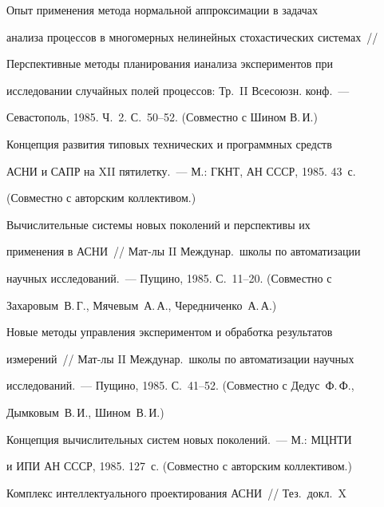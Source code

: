  Опыт применения метода нормальной аппроксимации в за\-дачах


анализа процессов в многомерных нелинейных сто\-ха\-сти\-че\-ских системах~//


Перспективные методы планирования и\linebreak анализа экспериментов при


исследовании случайных полей процессов: Тр.~II Всесоюзн. конф.~---


Севастополь, 1985. Ч.~2. С.~50--52. (Совместно с Шином В.\,И.)





 Концепция развития типовых технических и программных средств


АСНИ и САПР на XII пятилетку.~--- М.: ГКНТ, АН СССР, 1985. 43~с.


(Совместно с авторским коллективом.)





 Вычислительные системы новых поколений и перспективы их


применения в АСНИ~// Мат-лы II Междунар.\ школы по автоматизации


научных исследований.~--- Пущино, 1985. С.~11--20. (Совместно с


Захаровым~В.\,Г., Мячевым~А.\,А., Чередниченко~А.\,А.)





 Новые методы управления экспериментом и обработка результатов


измерений~// Мат-лы II Междунар.\ школы по автоматизации научных


исследований.~--- Пущино, 1985. С.~41--52. (Совместно с Дедус~Ф.\,Ф.,


Дымковым~В.\,И., Шином~В.\,И.)





 Концепция вычислительных систем новых поколений.~--- М.: МЦНТИ


и ИПИ АН СССР, 1985. 127~с. (Совместно с авторским коллективом.)


 \vspace*{-6pt}










 Комплекс интеллектуального проектирования АСНИ~// Тез.\ докл.\ X


